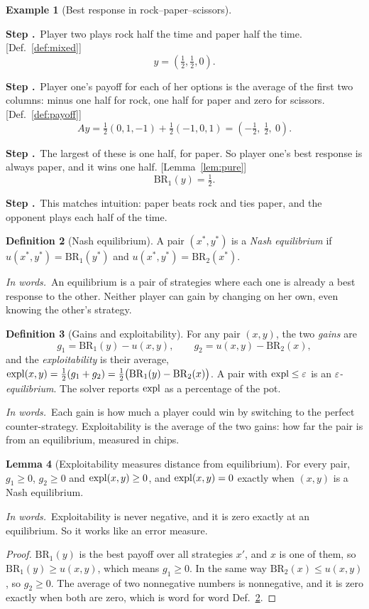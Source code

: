 \documentclass[11pt]{article}
\theoremstyle{definition}
\newtheorem{definition}{Definition}[section]
\newtheorem{example}[definition]{Example}
\newtheorem{lemma}[definition]{Lemma}
\newcommand{\inwords}{\par\smallskip\noindent\textit{In words.}\ }
\newcounter{stp}
\newcommand{\steps}{\setcounter{stp}{0}}
\newcommand{\st}{\stepcounter{stp}\par\medskip\noindent\textbf{Step \arabic{stp}.}\ }
\newcommand{\by}[1]{\hfill{\small\color{blue!50!black}[#1]}}
\newcommand{\Def}[1]{Def.~\ref{#1}}\newcommand{\Lem}[1]{Lemma~\ref{#1}}\newcommand{\Thm}[1]{Thm.~\ref{#1}}
\begin{document}
\begin{example}[Best response in rock--paper--scissors]\label{ex:rpsbr}
\steps
\st Player two plays rock half the time and paper half the time. \by{\Def{def:mixed}}
\[ y=(\tfrac12,\tfrac12,0). \]
\st Player one's payoff for each of her options is the average of the first two columns: minus one half for rock, one
half for paper and zero for scissors. \by{\Def{def:payoff}}
\[ Ay=\tfrac12(0,1,-1)+\tfrac12(-1,0,1)=(-\tfrac12,\ \tfrac12,\ 0). \]
\st The largest of these is one half, for paper. So player one's best response is always paper, and it wins one half.
\by{\Lem{lem:pure}}
\[ \mathrm{BR}_1(y)=\tfrac12. \]
\st This matches intuition: paper beats rock and ties paper, and the opponent plays each half of the time.
\end{example}

\begin{definition}[Nash equilibrium]\label{def:nash}
A pair $(x^\ast,y^\ast)$ is a \emph{Nash equilibrium} if $u(x^\ast,y^\ast)=\mathrm{BR}_1(y^\ast)$ and
$u(x^\ast,y^\ast)=\mathrm{BR}_2(x^\ast)$.
\inwords An equilibrium is a pair of strategies where each one is already a best response to the other. Neither
player can gain by changing on her own, even knowing the other's strategy.
\end{definition}

\begin{definition}[Gains and exploitability]\label{def:expl}
For any pair $(x,y)$, the two \emph{gains} are
\[ g_1=\mathrm{BR}_1(y)-u(x,y),\qquad g_2=u(x,y)-\mathrm{BR}_2(x), \]
and the \emph{exploitability} is their average, $\mathrm{expl}(x,y)=\tfrac12(g_1+g_2)=\tfrac12\big(\mathrm{BR}_1(y)-\mathrm{BR}_2(x)\big)$. A
pair with $\mathrm{expl}\le\varepsilon$ is an \emph{$\varepsilon$-equilibrium}. The solver reports $\mathrm{expl}$ as a percentage of the pot.
\inwords Each gain is how much a player could win by switching to the perfect counter-strategy. Exploitability is the
average of the two gains: how far the pair is from an equilibrium, measured in chips.
\end{definition}

\begin{lemma}[Exploitability measures distance from equilibrium]\label{lem:explzero}
For every pair, $g_1\ge0$, $g_2\ge0$ and $\mathrm{expl}(x,y)\ge0$, and $\mathrm{expl}(x,y)=0$ exactly when $(x,y)$ is a Nash equilibrium.
\inwords Exploitability is never negative, and it is zero exactly at an equilibrium. So it works like an error measure.
\end{lemma}
\begin{proof}
$\mathrm{BR}_1(y)$ is the best payoff over all strategies $x'$, and $x$ is one of them, so $\mathrm{BR}_1(y)\ge u(x,y)$, which
means $g_1\ge0$. In the same way $\mathrm{BR}_2(x)\le u(x,y)$, so $g_2\ge0$. The average of two nonnegative numbers is
nonnegative, and it is zero exactly when both are zero, which is word for word \Def{def:nash}.
\end{proof}
\end{document}
